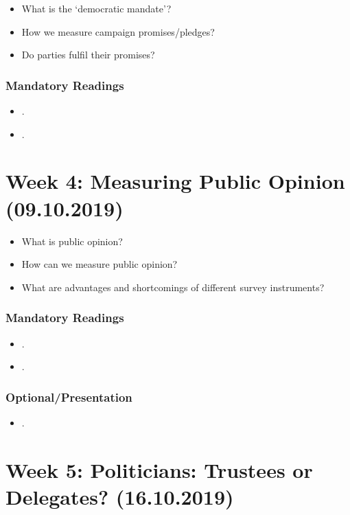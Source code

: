 \documentclass[abstract=on,parskip=full,headings=standardclasses,fontsize=11pt,paper=a4]{scrartcl}
\begin{document}
\begin{itemize}
\renewcommand\labelitemi{--}
\item What is the `democratic mandate'? 
\item How we measure campaign promises/pledges?
\item Do parties fulfil their promises?
\end{itemize}

\subsubsection*{Mandatory Readings}
\begin{itemize}
\item {}.
\item {}.
\end{itemize}


\section{Week 4: Measuring Public Opinion (09.10.2019)}


\begin{itemize}
\renewcommand\labelitemi{--}
\item What is public opinion?
\item How can we measure public opinion? 
\item What are advantages and shortcomings of different survey instruments?
\end{itemize}


\subsubsection*{Mandatory Readings}
\begin{itemize}
\item {}.
\item {}.
\end{itemize}


\subsubsection*{Optional/Presentation}
\begin{itemize}
\item {}.
\end{itemize}


\section{Week 5: Politicians: Trustees or Delegates? (16.10.2019)}
\end{document}
